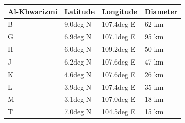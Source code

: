 \documentclass{article}
\begin{document}
\begin{tabular}{llll}
\toprule
Al-Khwarizmi & Latitude & Longitude & Diameter \\
\midrule
B & 9.0deg N & 107.4deg E & 62 km \\
G & 6.9deg N & 107.1deg E & 95 km \\
H & 6.0deg N & 109.2deg E & 50 km \\
J & 6.2deg N & 107.6deg E & 47 km \\
K & 4.6deg N & 107.6deg E & 26 km \\
L & 3.9deg N & 107.4deg E & 35 km \\
M & 3.1deg N & 107.0deg E & 18 km \\
T & 7.0deg N & 104.5deg E & 15 km \\
\bottomrule
\end{tabular}
\end{document}
